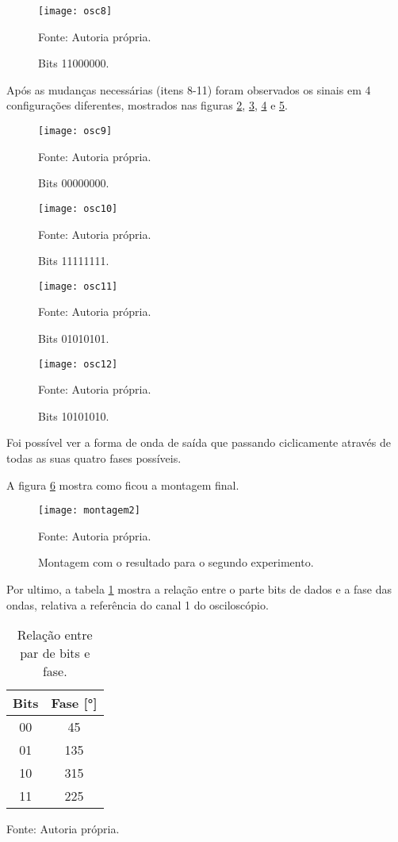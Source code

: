 \begin{figure}[H]
  \centering
  \caption{Bits 11000000.}
  \texttt{[image: osc8]}
  
  \small Fonte: Autoria própria.
  \label{fig:osc8}
\end{figure}

Após as mudanças necessárias (itens 8-11) foram observados os sinais em 4 configurações diferentes, mostrados nas figuras \ref{fig:osc9}, \ref{fig:osc10}, \ref{fig:osc11} e \ref{fig:osc12}.

\begin{figure}[H]
  \centering
  \caption{Bits 00000000.}
  \texttt{[image: osc9]}
  
  \small Fonte: Autoria própria.
  \label{fig:osc9}
\end{figure}

\begin{figure}[H]
  \centering
  \caption{Bits 11111111.}
  \texttt{[image: osc10]}
  
  \small Fonte: Autoria própria.
  \label{fig:osc10}
\end{figure}

\begin{figure}[H]
  \centering
  \caption{Bits 01010101.}
  \texttt{[image: osc11]}
  
  \small Fonte: Autoria própria.
  \label{fig:osc11}
\end{figure}

\begin{figure}[H]
  \centering
  \caption{Bits 10101010.}
  \texttt{[image: osc12]}
  
  \small Fonte: Autoria própria.
  \label{fig:osc12}
\end{figure}

Foi possível ver a forma de onda de saída que passando ciclicamente através de todas as suas quatro fases possíveis.

A figura \ref{fig:montagem2} mostra como ficou a montagem final.

\begin{figure}[H]
  \centering
  \caption{Montagem com o resultado para o segundo experimento.}
  \texttt{[image: montagem2]}
  
  \small Fonte: Autoria própria.
  \label{fig:montagem2}
\end{figure}

Por ultimo, a tabela \ref{tab:fases} mostra a relação entre o parte bits de dados e a fase das ondas, relativa a referência do canal 1 do osciloscópio.

\begin{table}[H]
  \centering
  \caption{Relação entre par de bits e fase.}
  \label{tab:fases}
  \begin{tabular}{cc}
    \toprule
    Bits & Fase [°] \\
    \midrule
    00 & 45 \\
    01 & 135 \\
    10 & 315 \\
    11 & 225 \\
    \bottomrule
  \end{tabular}
  
  \small Fonte: Autoria própria.
\end{table}
